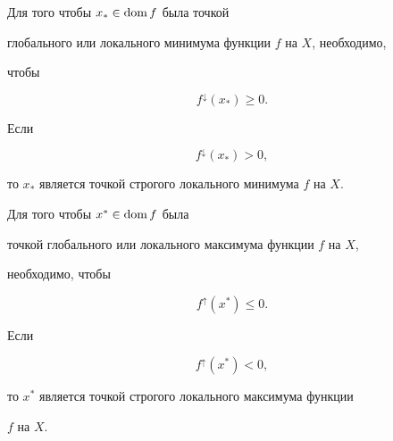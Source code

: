 \begin{thms}\label{t1.1}


Для того чтобы $x_{*}\in \operatorname{dom} f$ была точкой


глобального или локального минимума функции $f$ на $X$, необходимо,


чтобы


\begin{equation}\label{1.14a}


f^{\downarrow}(x_{*})\geq 0.


\end{equation}


Если 


$$




f^{\downarrow}(x_{*}) > 0,




$$


то $x_{*}$ является точкой строгого локального минимума $f$ на $X$.


\end{thms}








\begin{thms}\label{t1.2}


Для того чтобы $x^{*}\in \operatorname{dom} f$ была


точкой глобального или локального максимума функции $f$ на $X$,


необходимо, чтобы


\begin{equation}\label{1.16a}


f^{\uparrow}(x^{*})\leq 0.


\end{equation}


Если 


$$




f^{\uparrow}(x^{*})< 0,




$$


то $x^{*}$ является точкой строгого локального максимума функции


$f$ на $X$.


\end{thms}





